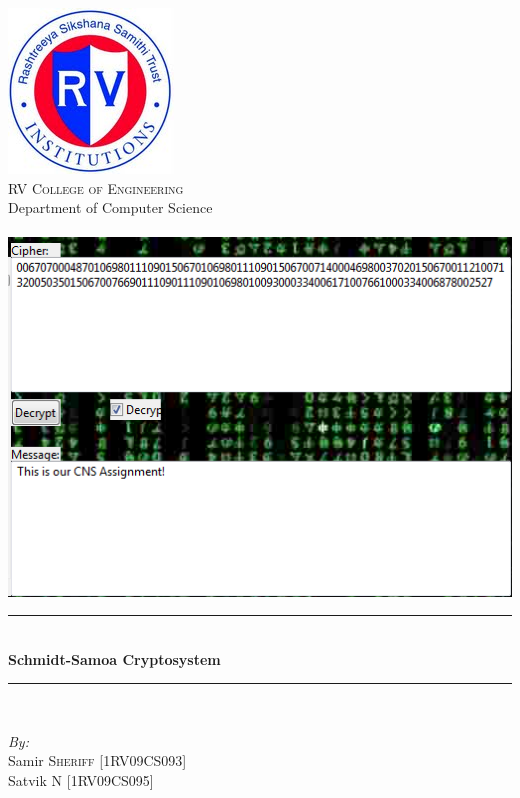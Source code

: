 \documentclass[12pt]{article} %
\newcommand{\HRule}{\rule{\linewidth}{0.5mm}}
\begin{document}
\maketitle
\begin{titlepage}

\begin{center}


\includegraphics[scale=0.75]{RVCE.png}\\[1cm]    

\textsc{\LARGE  RV College of Engineering}\\[0.5cm]
\large{Department of Computer Science}\\[1cm]
\textsc{\Large }\\[0.5cm]

\includegraphics[scale=1]{proj.png}\\[1cm]    

\HRule \\[0.4cm]
{  \huge\bfseries Schmidt-Samoa Cryptosystem }\\[0.4cm]

\HRule \\[1cm]

\begin{minipage}{0.8\textwidth}
\begin{flushleft} \large
\emph{By:}\\
Samir \textsc{Sheriff} [1RV09CS093]\\
Satvik \textsc{N} [1RV09CS095]\\



\end{flushleft}
\end{minipage}
\end{center}
\end{titlepage}
\end{document}
